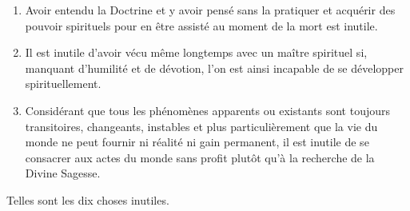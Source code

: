 \documentclass[10pt]{book}
\begin{document}
\begin{enumerate}[1.-]
\item Avoir entendu la Doctrine et y avoir pensé sans la pratiquer et acquérir des pouvoir spirituels pour en être assisté au moment de la mort est inutile.
\item Il est inutile d'avoir vécu même longtemps avec un maître spirituel si, manquant d'humilité et de dévotion, l'on est ainsi incapable de se développer spirituellement.
\item Considérant que tous les phénomènes apparents ou existants sont toujours transitoires, changeants, instables et plus particulièrement que la vie du monde ne peut fournir ni réalité ni gain permanent, il est inutile de se consacrer aux actes du monde sans profit plutôt qu'à la recherche de la Divine Sagesse.
\end{enumerate}
Telles sont les dix choses inutiles.
\end{document}
